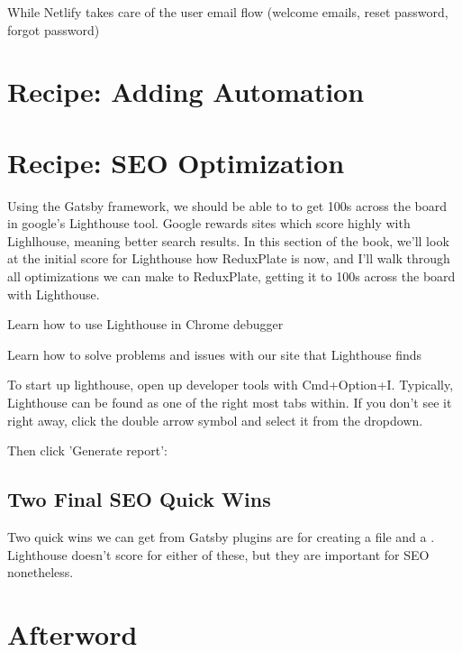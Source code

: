 \documentclass[paper=6in:9in,pagesize=pdftex,headinclude=on,footinclude=on,12pt,twoside]{scrbook}
\begin{document}
While Netlify takes care of the user email flow (welcome emails, reset password, forgot password)

\chapter{Recipe: Adding Automation}

\chapter{Recipe: SEO Optimization}


Using the Gatsby framework, we should be able to to get 100s across the board in google's Lighthouse tool. Google rewards sites which score highly with Lighlhouse, meaning better search results. In this section of the book, we'll look at the initial score for Lighthouse how ReduxPlate is now, and I'll walk through all optimizations we can make to ReduxPlate, getting it to 100s across the board with Lighthouse.

\begin{arrows}
\item Learn how to use Lighthouse in Chrome debugger
\item Learn how to solve problems and issues with our site that Lighthouse finds
\end{arrows}

To start up lighthouse, open up developer tools with Cmd+Option+I. Typically, Lighthouse can be found as one of the right most tabs within. If you don't see it right away, click the double arrow symbol and select it from the dropdown.

Then click 'Generate report':


\section{Two Final SEO Quick Wins}

Two quick wins we can get from Gatsby plugins are for creating a  file and a . Lighthouse doesn't score for either of these, but they are important for SEO nonetheless.

\chapter*{Afterword}
\end{document}
